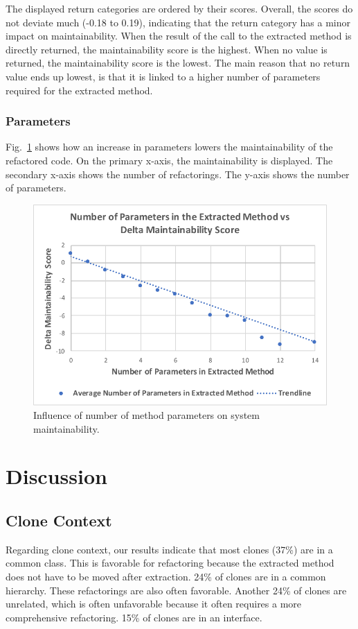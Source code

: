 \documentclass[conference]{IEEEtran}
\begin{document}
The displayed return categories are ordered by their scores. Overall, the scores do not deviate much (-0.18 to 0.19), indicating that the return category has a minor impact on maintainability. When the result of the call to the extracted method is directly returned, the maintainability score is the highest. When no value is returned, the maintainability score is the lowest. The main reason that no return value ends up lowest, is that it is linked to a higher number of parameters required for the extracted method.

\subsubsection{Parameters}
Fig.~\ref{fig:arguments} shows how an increase in parameters lowers the maintainability of the refactored code. On the primary x-axis, the maintainability is displayed. The secondary x-axis shows the number of refactorings. The y-axis shows the number of parameters.

\begin{figure}[H]
  \includegraphics[width=1\columnwidth]{img/arguments}
  \caption{Influence of number of method parameters on system maintainability.}
  \label{fig:arguments}
\end{figure}

\section{Discussion}

\subsection{Clone Context}
Regarding clone context, our results indicate that most clones (37\%) are in a common class. This is favorable for refactoring because the extracted method does not have to be moved after extraction. 24\% of clones are in a common hierarchy. These refactorings are also often favorable. Another 24\% of clones are unrelated, which is often unfavorable because it often requires a more comprehensive refactoring. 15\% of clones are in an interface.
\end{document}
